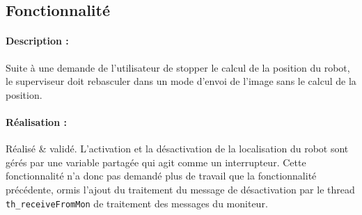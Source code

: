 \documentclass[11pt, a4paper]{paper}
\newcounter{cptreq}
\begin{document}
\subsection{Fonctionnalité \thecptreq}

\paragraph{Description :} Suite à une demande de l'utilisateur de stopper le calcul de la position du robot, le superviseur doit rebasculer dans un mode d'envoi de l'image sans le calcul de la position.

\paragraph{\color{black}Réalisation :}  {\color{black} Réalisé \& validé. L'activation et la désactivation de la localisation du robot sont gérés par une variable partagée qui agit comme un interrupteur. Cette fonctionnalité n'a donc pas demandé plus de travail que la fonctionnalité précédente, ormis l'ajout du traitement du message de désactivation par le thread {\tt th\_receiveFromMon} de traitement des messages du moniteur.}
\end{document}
